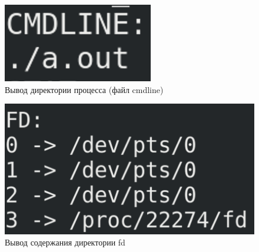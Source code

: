 \begin{figure}[H]
    \centering
    \includegraphics{img/part_01/cmdline.png}
    \caption{Вывод директории процесса (файл {\ttfamily cmdline})}
\end{figure}

\begin{figure}[H]
    \centering
    \includegraphics{img/part_01/fd.png}
    \caption{Вывод содержания директории {\ttfamily fd}}
\end{figure}


